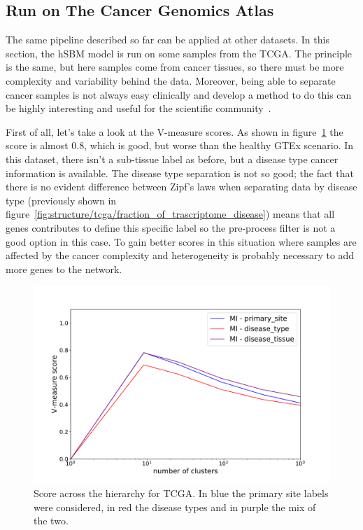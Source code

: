 \subsection{Run on The Cancer Genomics Atlas}
The same pipeline described so far can be applied at other datasets. In this section, the hSBM model is run on some samples from the TCGA. The principle is the same, but here samples come from cancer tissues, so there must be more complexity and variability behind the data. Moreover, being able to separate cancer samples is not always easy clinically and develop a method to do this can be highly interesting and useful for the scientific community~\cite{Farver2018}. 

First of all, let's take a look at the V-measure scores. As shown in figure~\ref{fig:topic/tcga/metric} the score is almost $0.8$, which is good, but worse than the healthy GTEx scenario. In this dataset, there isn't a sub-tissue label as before, but a disease type cancer information is available. The disease type separation is not so good; the fact that there is no evident difference between Zipf's laws when separating data by disease type (previously shown in figure~\ref{fig:structure/tcga/fraction_of_trascriptome_disease}) means that all genes contributes to define this specific label so the pre-process filter is not a good option in this case. To gain better scores in this situation where samples are affected by the cancer complexity and heterogeneity is probably necessary to add more genes to the network.
\begin{figure}[htb!]
    \centering
    \includegraphics[width=0.8\linewidth]{pictures/topic/tcga/metric.pdf}
    \caption{Score across the hierarchy for TCGA. In blue the primary site labels were considered, in red the disease types and in purple the mix of the two.}
    \label{fig:topic/tcga/metric}
\end{figure}

